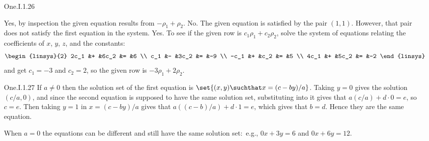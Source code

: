 \begin{ans}{One.I.1.26}
       \begin{exparts}
        \partsitem Yes, by inspection the given equation results from
          \( -\rho_1+\rho_2 \).
        \partsitem No.
          The given equation is satisfied by the pair \( (1,1) \).
          However, that pair
          does not satisfy the first equation in the system.
        \partsitem Yes.
          To see if the given row is \( c_1\rho_1+c_2\rho_2 \), solve
          the system of equations relating the coefficients of $x$, $y$,
          $z$, and the constants:
          \begin{equation*}
            \begin{linsys}{2}
               2c_1  &+  &6c_2  &=  &6  \\
                c_1  &-  &3c_2  &=  &-9 \\
               -c_1  &+  &c_2   &=  &5  \\
               4c_1  &+  &5c_2  &=  &-2
            \end{linsys}
          \end{equation*}
          and get $c_1=-3$ and $c_2=2$, so the given row is
          \( -3\rho_1+2\rho_2 \).
      \end{exparts}
     
\end{ans}
\begin{ans}{One.I.1.27}
      If \( a\neq 0 \) then the solution set of the first equation is
      \( \set{(x,y)\suchthat x=(c-by)/a} \).
      Taking $y=0$ gives the solution $(c/a,0)$, and since the second
      equation is supposed to have the same solution set, substituting into
      it gives that $a(c/a)+d\cdot 0=e$, so $c=e$.
      Then taking $y=1$ in $x=(c-by)/a$ gives that $a((c-b)/a)+d\cdot 1=e$,
      which gives that $b=d$.
      Hence they are the same equation.

      When \( a=0 \) the equations can be different and still have the
      same solution set:~e.g.,
      \( 0x+3y=6 \) and \( 0x+6y=12 \).
     
\end{ans}
